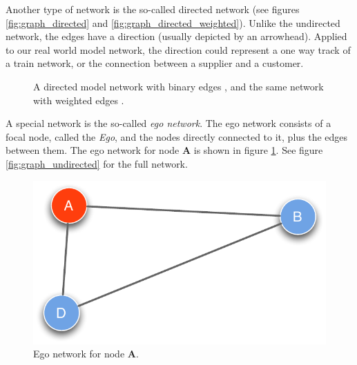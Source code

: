 Another type of network is the so-called directed network (see figures \ref{fig:graph_directed} and \ref{fig:graph_directed_weighted}). Unlike the undirected network, the edges have a direction (usually depicted by an arrowhead). Applied to our real world model network, the direction could represent a one way track of a train network, or the connection between a supplier and a customer.  

\begin{figure}[htpb]%
	\centering 
	\qquad 
	\caption[Directed model network with binary and weighted edges]{A directed model network with binary edges , and the same network with weighted edges .} 

\end{figure}

A special network is the so-called \textit{ego network}. The ego network consists of a focal node, called the \textit{Ego}, and the nodes directly connected to it, plus the edges between them. The ego network for node \textbf{A} is shown in figure \ref{fig:graph_ego}. See figure \ref{fig:graph_undirected} for the full network.

\begin{figure}[htbp]
\begin{center}
  \includegraphics[width=.45\textwidth]{assets/pdf/graph_egocentric.pdf}
  \caption[Ego network]{Ego network for node \textbf{A}.}
  \label{fig:graph_ego}
\end{center}
\end{figure}  

